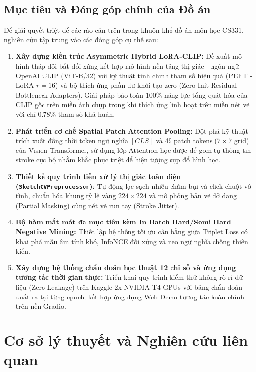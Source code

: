 \documentclass[12pt,a4paper]{report}
\begin{document}
\section{Mục tiêu và Đóng góp chính của Đồ án}
Để giải quyết triệt để các rào cản trên trong khuôn khổ đồ án môn học CS331, nghiên cứu tập trung vào các đóng góp cụ thể sau:
\begin{enumerate}
    \item \textbf{Xây dựng kiến trúc Asymmetric Hybrid LoRA-CLIP:} Đề xuất mô hình tháp đôi bất đối xứng kết hợp mô hình nền tảng thị giác - ngôn ngữ OpenAI CLIP (ViT-B/32) với kỹ thuật tinh chỉnh tham số hiệu quả (PEFT - LoRA $r=16$) và bộ thích ứng phần dư khởi tạo zero (Zero-Init Residual Bottleneck Adapters). Giải pháp bảo toàn 100\% năng lực tổng quát hóa của CLIP gốc trên miền ảnh chụp trong khi thích ứng linh hoạt trên miền nét vẽ với chỉ 0.78\% tham số khả huấn.
    \item \textbf{Phát triển cơ chế Spatial Patch Attention Pooling:} Đột phá kỹ thuật trích xuất đồng thời token ngữ nghĩa $[CLS]$ và 49 patch tokens ($7 \times 7$ grid) của Vision Transformer, sử dụng lớp Attention học được để gom tụ thông tin stroke cục bộ nhằm khắc phục triệt để hiện tượng sụp đổ hình học.
    \item \textbf{Thiết kế quy trình tiền xử lý thị giác toàn diện (\texttt{SketchCVPreprocessor}):} Tự động lọc sạch nhiễu chấm bụi và click chuột vô tình, chuẩn hóa khung tỷ lệ vàng $224 \times 224$ và mô phỏng bản vẽ dở dang (Partial Masking) cùng nét vẽ run tay (Stroke Jitter).
    \item \textbf{Bộ hàm mất mát đa mục tiêu kèm In-Batch Hard/Semi-Hard Negative Mining:} Thiết lập hệ thống tối ưu cân bằng giữa Triplet Loss có khai phá mẫu âm tính khó, InfoNCE đối xứng và neo ngữ nghĩa chống thiên kiến.
    \item \textbf{Xây dựng hệ thống chẩn đoán học thuật 12 chỉ số và ứng dụng tương tác thời gian thực:} Triển khai quy trình kiểm thử không rò rỉ dữ liệu (Zero Leakage) trên Kaggle 2x NVIDIA T4 GPUs với bảng chẩn đoán xuất ra tại từng epoch, kết hợp ứng dụng Web Demo tương tác hoàn chỉnh trên nền Gradio.
\end{enumerate}

\chapter{Cơ sở lý thuyết và Nghiên cứu liên quan}
\end{document}
